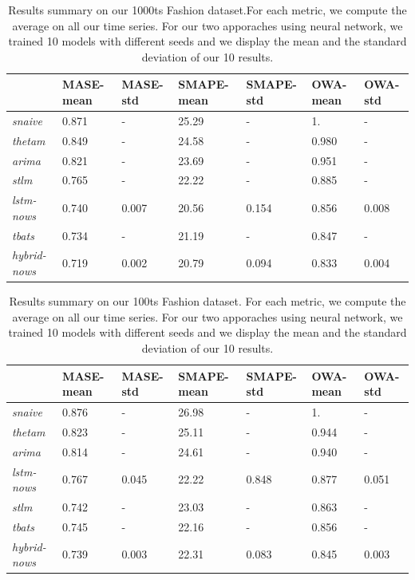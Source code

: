 \documentclass{article} %
\begin{document}
\begin{table}
  \caption{Results summary on our 1000ts Fashion dataset.For each metric, we compute the average on all our time series. For our two apporaches using neural network, we trained 10 models with different seeds and we display the mean and the standard deviation of our 10 results.}
  \centering
  \begin{tabular}{lllllll}
    \hline
    &  MASE-mean  & MASE-std & SMAPE-mean & SMAPE-std & OWA-mean & OWA-std  \\
    \hline
     \textit{snaive} & 0.871 & - & 25.29 & - & 1. & -\\
     \textit{thetam}  & 0.849 & - & 24.58 & - & 0.980 & -\\
     \textit{arima} & 0.821 & - & 23.69 & - & 0.951 & -\\
     \textit{stlm} & 0.765 & - & 22.22 & - & 0.885 & -\\
     \textit{lstm-nows} & 0.740 & 0.007 & 20.56 & 0.154 & 0.856 & 0.008\\
     \textit{tbats} & 0.734 & - & 21.19 & - & 0.847 & -\\
     \textit{hybrid-nows} & 0.719 & 0.002 & 20.79 & 0.094 & 0.833 & 0.004\\
    \hline
  \end{tabular}
\label{tab:metricresults}
\end{table}

\begin{table}
  \caption{Results summary on our 100ts Fashion dataset. For each metric, we compute the average on all our time series. For our two apporaches using neural network, we trained 10 models with different seeds and we display the mean and the standard deviation of our 10 results.}
  \centering
  \begin{tabular}{lllllll}
    \hline
    &  MASE-mean  & MASE-std & SMAPE-mean & SMAPE-std & OWA-mean & OWA-std  \\
    \hline
     \textit{snaive} & 0.876 & - & 26.98 & - & 1. & -\\
     \textit{thetam}  & 0.823 & - & 25.11 & - & 0.944 & -\\
     \textit{arima} & 0.814 & - & 24.61 & - & 0.940 & -\\
     \textit{lstm-nows} & 0.767 & 0.045 & 22.22 & 0.848 & 0.877 & 0.051\\
     \textit{stlm} & 0.742 & - & 23.03 & - & 0.863 & -\\
     \textit{tbats} & 0.745 & - & 22.16 & - & 0.856 & -\\
     \textit{hybrid-nows} & 0.739 & 0.003 & 22.31 & 0.083 & 0.845 & 0.003\\
    \hline
  \end{tabular}
\label{tab:metricresults}
\end{table}
\end{document}
